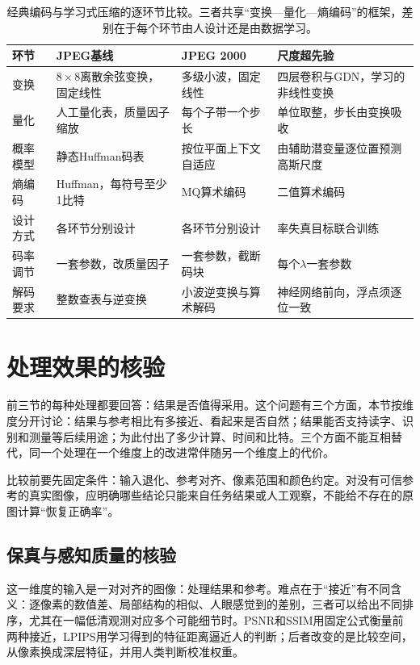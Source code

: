 \begin{table}[tbp]
 \centering
 \small
 \begin{tabularx}{\linewidth}{@{}p{18mm}XXX@{}}
  \toprule
  环节 & JPEG基线 & JPEG 2000 & 尺度超先验\\
  \midrule
  变换 & $8\times8$离散余弦变换，固定线性 & 多级小波，固定线性 & 四层卷积与GDN，学习的非线性变换\\
  量化 & 人工量化表，质量因子缩放 & 每个子带一个步长 & 单位取整，步长由变换吸收\\
  概率模型 & 静态Huffman码表 & 按位平面上下文自适应 & 由辅助潜变量逐位置预测高斯尺度\\
  熵编码 & Huffman，每符号至少1比特 & MQ算术编码 & 二值算术编码\\
  设计方式 & 各环节分别设计 & 各环节分别设计 & 率失真目标联合训练\\
  码率调节 & 一套参数，改质量因子 & 一套参数，截断码块 & 每个$\lambda$一套参数\\
  解码要求 & 整数查表与逆变换 & 小波逆变换与算术解码 & 神经网络前向，浮点须逐位一致\\
  \bottomrule
 \end{tabularx}
 \caption{经典编码与学习式压缩的逐环节比较。三者共享“变换—量化—熵编码”的框架，差别在于每个环节由人设计还是由数据学习。}
 \label{tab:vision-codec-compare}
\end{table}

\section{处理效果的核验}
\label{sec:vision-restoration-evaluation}

前三节的每种处理都要回答：结果是否值得采用。这个问题有三个方面，本节按维度分开讨论：结果与参考相比有多接近、看起来是否自然；结果能否支持读字、识别和测量等后续用途；为此付出了多少计算、时间和比特。三个方面不能互相替代，同一个处理在一个维度上的改进常伴随另一个维度上的代价。

比较前要先固定条件：输入退化、参考对齐、像素范围和颜色约定。对没有可信参考的真实图像，应明确哪些结论只能来自任务结果或人工观察，不能给不存在的原图计算“恢复正确率”。

\subsection{保真与感知质量的核验}
\label{sec:vision-restoration-quality}

这一维度的输入是一对对齐的图像：处理结果和参考。难点在于“接近”有不同含义：逐像素的数值差、局部结构的相似、人眼感觉到的差别，三者可以给出不同排序，尤其在一幅低清观测对应多个可能细节时。PSNR和SSIM用固定公式衡量前两种接近，LPIPS用学习得到的特征距离逼近人的判断；后者改变的是比较空间，从像素换成深层特征，并用人类判断校准权重。

